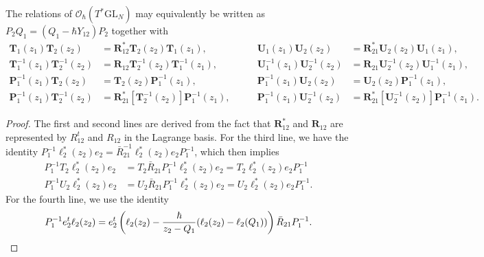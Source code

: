 \begin{prop}
The relations of $\mathcal{O}_\hbar(T^* \mathrm{GL}_N)$ may equivalently be written as $P_2 Q_1 = (Q_1 - \hbar Y_{12}) P_2$ together with
\begin{equation}
\begin{aligned}
\mathbf{T}_1(z_1) \mathbf{T}_2(z_2) &= \mathbf{R}_{12}^* \mathbf{T}_2(z_2) \mathbf{T}_1(z_1), \\
\mathbf{T}_1^{-1}(z_1) \mathbf{T}_2^{-1}(z_2) &= \mathbf{R}_{12} \mathbf{T}_2^{-1}(z_2) \mathbf{T}_1^{-1}(z_1), \\
\mathbf{P}_1^{-1}(z_1) \mathbf{T}_2(z_2) &= \mathbf{T}_2(z_2) \mathbf{P}_1^{-1}(z_1), \\
\mathbf{P}_1^{-1}(z_1) \mathbf{T}_2^{-1}(z_2) &= \mathbf{R}_{21}^* [\mathbf{T}_2^{-1}(z_2)] \mathbf{P}_1^{-1}(z_1),
\end{aligned}
\qquad
\begin{aligned}
\mathbf{U}_1(z_1) \mathbf{U}_2(z_2) &= \mathbf{R}_{21}^* \mathbf{U}_2(z_2) \mathbf{U}_1(z_1), \\
\mathbf{U}_1^{-1}(z_1) \mathbf{U}_2^{-1}(z_2) &= \mathbf{R}_{21} \mathbf{U}_2^{-1}(z_2) \mathbf{U}_1^{-1}(z_1), \\
\mathbf{P}_1^{-1}(z_1) \mathbf{U}_2(z_2) &= \mathbf{U}_2(z_2) \mathbf{P}_1^{-1}(z_1), \\
\mathbf{P}_1^{-1}(z_1) \mathbf{U}_2^{-1}(z_2) &= \mathbf{R}_{21}^* [\mathbf{U}_2^{-1}(z_2)] \mathbf{P}_1^{-1}(z_1).
\end{aligned}
\end{equation}
\end{prop}

\begin{proof}
The first and second lines are derived from the fact that $\mathbf{R}_{12}^*$ and $\mathbf{R}_{12}$ are represented by $R_{12}^t$ and $R_{12}$ in the Lagrange basis. For the third line, we have the identity $P_1^{-1} \ell_2^*(z_2) e_2 = \bar R_{21}^{-1} \ell_2^*(z_2) e_2 P_1^{-1}$, which then implies
\begin{align*}
P_1^{-1} T_2 \ell_2^*(z_2) e_2 &= T_2 \bar R_{21} P_1^{-1} \ell_2^*(z_2) e_2 = T_2 \ell_2^*(z_2) e_2 P_1^{-1} \\
P_1^{-1} U_2 \ell_2^*(z_2) e_2 &= U_2 \bar R_{21} P_1^{-1} \ell_2^*(z_2) e_2 = U_2 \ell_2^*(z_2) e_2 P_1^{-1}.
\end{align*}
For the fourth line, we use the identity
\begin{equation*}
P_1^{-1} e_2^t \ell_2(z_2) = e_2^t \left( \ell_2(z_2) - \frac{\hbar}{z_2-Q_1} (\ell_2(z_2) - \ell_2(Q_1)) \right) \bar R_{21} P_1^{-1}. \qedhere
\end{equation*}
\end{proof}

